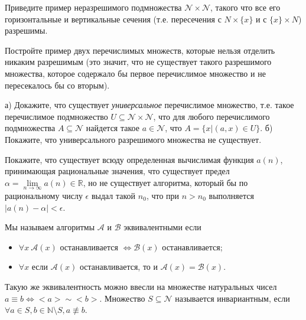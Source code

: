 \setcounter{curtask}{9}



\begin{task}
	Приведите пример неразрешимого подмножества $\mathcal{N} \times \mathcal{N}$, такого что все его горизонтальные и вертикальные
    сечения (т.е. пересечения с $N \times \{x\}$ и с $\{x\} \times N$) разрешимы. 
\end{task}


\begin{task}
    Постройте пример двух перечислимых множеств, которые нельзя отделить никаким разрешимым (это значит, что не существует такого
    разрешимого множества, которое содержало бы первое перечислимое множество и не пересекалось бы со вторым).
\end{task}


\begin{task}
    а) Докажите, что существует \textit{универсальное} перечислимое множество, т.е. такое перечислимое подмножество $U \subseteq
    \mathcal{N} \times \mathcal{N}$, что для любого перечислимого подмножества $A \subseteq \mathcal{N}$ найдется такое $a \in
    \mathcal{N}$, что $A = \{x | (a, x) \in U\}$.
	б) Покажите, что универсального разрешимого множества не существует.
\end{task}

\begin{task}
	Покажите, что существует всюду определенная вычислимая функция $a(n)$, принимающая рациональные значения, что существует
    предел $\alpha = \lim\limits_{n \to \infty} a(n) \in \mathbb{R}$, но не существует алгоритма, который бы по рациональному
    числу $\epsilon$ выдал такой $n_0$, что при $n > n_0$ выполняется $|a(n) - \alpha| < \epsilon$. 
\end{task}



Мы называем алгоритмы $\mathcal{A}$ и $\mathcal{B}$ эквивалентными если 
\begin{itemize}
	\item $\forall x\  \mathcal{A}(x)$ останавливается $\Leftrightarrow \mathcal{B}(x)$ останавливается;
	\item $\forall x$ если $\mathcal{A}(x)$ останавливается, то и $\mathcal{A}(x) = \mathcal{B}(x)$.
\end{itemize} 

Такую же эквивалентность можно ввесли на множестве натуральных чисел $a \equiv b \Leftrightarrow {<}a{>} \sim {<}b{>}$. Множество
$S\subseteq \mathcal{N}$ называется инвариантным, если $\forall a \in S, b \in \mathbb{N} \setminus S, a \not\equiv b$.

